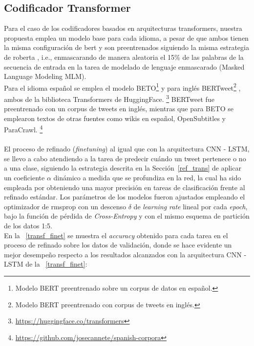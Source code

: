  	\subsection{Codificador Transformer}
	Para el caso de los codificadores basados en arquitecturas transformers, nuestra propuesta emplea un modelo base para cada idioma, a pesar de que ambos tienen la misma configuración de \ac{bert} \citep{DBLP:journals/corr/abs-1810-04805} y son preentrenados siguiendo la misma estrategia de \ac{roberta} \citep{liu2019roberta}, i.e., enmascarando de manera aleatoria el 15\% de las palabras de la secuencia de entrada en la tarea de modelado de lenguaje enmascarado (Masked Language Modeling MLM).
	\\ 
	Para el idioma español se emplea el modelo BETO\footnote{Modelo BERT  preentrenado sobre un corpus de datos en español.} \citep{CaneteCFP2020} y para inglés BERTweet\footnote{Modelo BERT preentrenado con corpus de tweets en inglés.} \citep{bertweet}, ambos de la biblioteca Transformers de HuggingFace. \footnote{\url{https://huggingface.co/transformers}} BERTweet fue preentrenado con un corpus de tweets en inglés, mientras que para BETO se emplearon textos de otras fuentes como wikis en español, OpenSubtitles y ParaCrawl. \footnote{\url{https://github.com/josecannete/spanish-corpora}}
	\\\\
	El proceso de refinado (\textit{finetuning}) al igual que con la arquitectura CNN - LSTM, se llevo a cabo atendiendo a la tarea de predecir cuándo un tweet pertenece o no a una clase, siguiendo la estrategia descrita en la Sección~\ref{ref_trans} de aplicar un coeficiente $\alpha$ dinámico a medida que se profundiza en la red, la cual ha sido empleada por \citep{palomino-ochoa-luna-2020-palomino,Sem} obteniendo una mayor precisión en tareas de clasificación frente al refinado estándar. Los parámetros de los modelos fueron ajustados empleando el optimizador de \ac{rmsprop} \citep{hinton2012lecture} con un descenso $\delta$ de\textit{ learning rate} lineal por cada \textit{epoch}, bajo la función de pérdida de \textit{Cross-Entropy} y con el mismo esquema de partición de los datos 1:5.	\\
	En la \tablename~\ref{transf_finet} se muestra el \textit{accuracy} obtenido para cada tarea en el proceso de refinado sobre los datos de validación, donde se hace evidente un mejor desempeño respecto a los resultados alcanzados con la arquitectura CNN - LSTM de la \tablename~\ref{transf_finet}:
